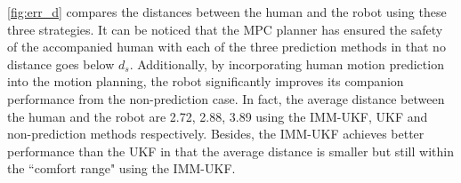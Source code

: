 \documentclass[letterpaper, 10 pt, conference]{ieeeconf}
\begin{document}
	\cref{fig:err_d} compares the distances between the human and the robot using these three strategies.
	It can be noticed that the MPC planner has ensured the safety of the accompanied human with each of the three prediction methods in that no distance goes below $d_s$.
	Additionally, by incorporating human motion prediction into the motion planning, the robot significantly improves its companion performance from the non-prediction case.
	In fact, the average distance between the human and the robot are 2.72, 2.88, 3.89 using the IMM-UKF, UKF and non-prediction methods respectively.
	Besides, the IMM-UKF achieves better performance than the UKF in that the average distance is smaller but still within the ``comfort range" using the IMM-UKF.
\end{document}
